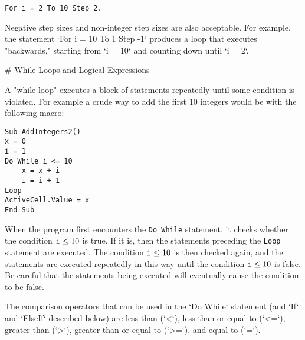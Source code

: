 \small\begin{verbatim}
For i = 2 To 10 Step 2.
\end{verbatim}\normalsize
Negative step sizes and non-integer step sizes are also acceptable. For
example, the statement `For i = 10 To 1 Step -1` produces a loop that
executes "backwards," starting from `i = 10` and counting down until
`i = 2`.

# While Loops and Logical Expressions


A "while loop" executes a block of statements repeatedly until some
condition is violated. For example a crude way to add the first 10
integers would be with the following macro:

\small\begin{verbatim}
Sub AddIntegers2()
x = 0
i = 1
Do While i <= 10
    x = x + i
    i = i + 1
Loop
ActiveCell.Value = x
End Sub
\end{verbatim}\normalsize

When the program first encounters the \verb!Do While! statement, it checks whether the condition $\verb!i! \leq 10$ is true.  If it is, then the statements preceding the \verb!Loop! statement are executed.  The condition $\verb!i!\leq 10$ is then checked again, and the statements are executed repeatedly in this way until the condition $\verb!i! \leq 10$ is false.  Be careful that the statements being executed will eventually cause the condition to be false.  

The comparison operators that can be used in the `Do While` statement
(and `If` and `ElseIf` described below) are less than (`<`), less than
or equal to (`<=`), greater than (`>`), greater than or equal to (`>=`),
and equal to (`=`).

